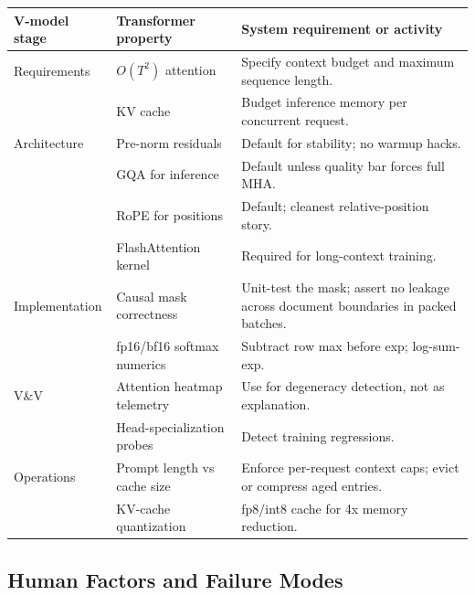 \begin{center}
\begin{tabular}{|p{3.4cm}|p{3.4cm}|p{6.8cm}|}
\hline
V-model stage & Transformer property & System requirement or activity \\
\hline
Requirements & $O(T^2)$ attention
             & Specify context budget and maximum sequence length. \\
 & KV cache & Budget inference memory per concurrent request. \\
\hline
Architecture & Pre-norm residuals
             & Default for stability; no warmup hacks. \\
 & GQA for inference & Default unless quality bar forces full MHA. \\
 & RoPE for positions & Default; cleanest relative-position story. \\
 & FlashAttention kernel & Required for long-context training. \\
\hline
Implementation & Causal mask correctness
               & Unit-test the mask; assert no leakage across
                 document boundaries in packed batches. \\
 & fp16/bf16 softmax numerics
               & Subtract row max before exp; log-sum-exp. \\
\hline
V\&V & Attention heatmap telemetry
     & Use for degeneracy detection, not as explanation. \\
 & Head-specialization probes & Detect training regressions. \\
\hline
Operations & Prompt length vs cache size
           & Enforce per-request context caps; evict or
             compress aged entries. \\
 & KV-cache quantization & fp8/int8 cache for 4x memory reduction. \\
\hline
\end{tabular}
\end{center}

\subsection{Human Factors and Failure Modes}

